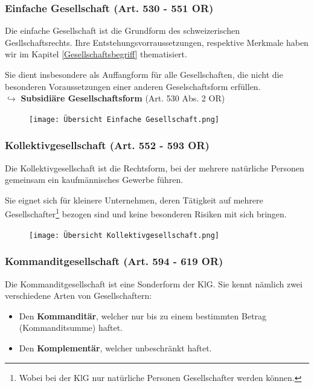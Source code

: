 \documentclass[12pt]{article}
\begin{document}
\subsubsection{Einfache Gesellschaft (Art. 530 - 551 OR)}
Die einfache Gesellschaft ist die Grundform des schweizerischen Gesllschaftsrechts. Ihre Entstehungsvorraussetzungen, respektive Merkmale haben wir im Kapitel \ref{Gesellschaftsbegriff} thematisiert. 

Sie dient insbesondere als Auffangform für alle Gesellschaften, die nicht die besonderen Voraussetzungen einer anderen Geselschaftsform erfüllen.\\
$\hookrightarrow$ \textbf{Subsidiäre Gesellschaftsform} (Art. 530 Abs. 2 OR)
\begin{figure}[h]
    \begin{center}
            \texttt{[image: Übersicht Einfache Gesellschaft.png]}
    \end{center}
\end{figure}

\subsubsection{Kollektivgesellschaft (Art. 552 - 593 OR)}
Die Kollektivgesellschaft ist die Rechtsform, bei der mehrere natürliche Personen gemeinsam ein kaufmännisches Gewerbe führen.

Sie eignet sich für kleinere Unternehmen, deren Tätigkeit auf mehrere Gesellschafter\footnote{Wobei bei der KlG nur natürliche Personen Gesellschafter werden können.} bezogen sind und keine besonderen Risiken mit sich bringen.
\begin{figure}[h]
    \begin{center}
            \texttt{[image: Übersicht Kollektivgesellschaft.png]}
    \end{center}
\end{figure}

\subsubsection{Kommanditgesellschaft (Art. 594 - 619 OR)}
Die Kommanditgesellschaft ist eine Sonderform der KlG. Sie kennt nämlich zwei verschiedene Arten von Gesellschaftern:
\begin{itemize}
    \item Den \textbf{Kommanditär}, welcher nur bis zu einem bestimmten Betrag (Kommanditsumme) haftet.
    \item Den \textbf{Komplementär}, welcher unbeschränkt haftet.
\end{itemize}
\end{document}
